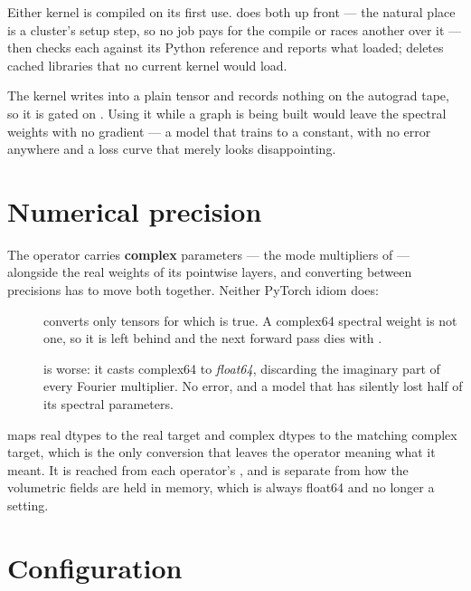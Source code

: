 Either kernel is compiled on its first use.  does both up
front --- the natural place is a cluster's setup step, so no job pays for the
compile or races another over it --- then checks each against its Python
reference and reports what loaded;  deletes cached libraries
that no current kernel would load.

\begin{pwarn}
The kernel writes into a plain tensor and records nothing on the autograd
tape, so it is gated on . Using it while a graph
is being built would leave the spectral weights with no gradient --- a model
that trains to a constant, with no error anywhere and a loss curve that merely
looks disappointing.
\end{pwarn}

\section{Numerical precision}

The operator carries \textbf{complex} parameters --- the mode multipliers of
 --- alongside the real weights of its pointwise layers,
and converting between precisions has to move both together. Neither PyTorch
idiom does:

\begin{description}
  \item[] converts only tensors for which
     is true. A complex64 spectral weight is not
    one, so it is left behind and the next forward pass dies with
    .
  \item[] is worse: it casts complex64 to
    \emph{float64}, discarding the imaginary part of every Fourier multiplier.
    No error, and a model that has silently lost half of its spectral
    parameters.
\end{description}

 maps real dtypes to the real target and complex dtypes to
the matching complex target, which is the only conversion that leaves the
operator meaning what it meant. It is reached from each operator's , and is separate from
how the volumetric fields are held in memory, which is always float64 and no
longer a setting.

\section{Configuration}

